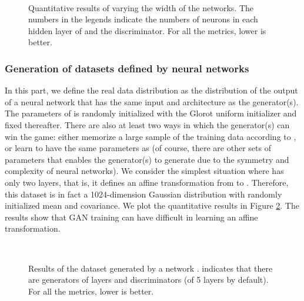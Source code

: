 \documentclass[conference]{IEEEtran}
\begin{document}
\begin{figure}[!h]
	\begin{center}
		\\
	\end{center}
	\caption{Quantitative results of varying the width of the networks. The numbers in the legends indicate the numbers of neurons in each hidden layer of and the discriminator. For all the metrics, lower is better.}
	\label{width_quant}
\end{figure}

\subsubsection{Generation of datasets defined by neural networks}
In this part, we define the real data distribution as the distribution of the output of a neural network  that has the same input and architecture as the generator(s). The parameters of  is randomly initialized with the Glorot uniform initializer \cite{glorot} and fixed thereafter. There are also at least two ways in which the generator(s) can win the game: either memorize a large sample of the training data according to \cite{generalization}, or learn to have the same parameters as  (of course, there are other sets of parameters that enables the generator(s) to generate  due to the symmetry and complexity of neural networks). We consider the simplest situation where  has only two layers, that is, it defines an affine transformation from  to . Therefore, this dataset is in fact a 1024-dimension Gaussian distribution with randomly initialized mean and covariance. We plot the quantitative results in Figure \ref{net_comp_quant}.
The results show that GAN training can have difficult in learning an affine transformation.
\begin{figure}[!h]
	\begin{center}
		\\
	\end{center}
	\caption{Results of the dataset generated by a network .  indicates that there are  generators of  layers and  discriminators (of 5 layers by default). For all the metrics, lower is better.}
	\label{net_comp_quant}
\end{figure}
\end{document}
